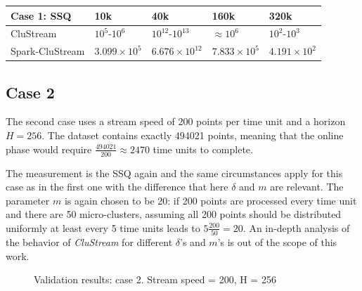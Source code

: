 \documentclass{llncs}
\begin{document}
\begin{center}
\begin{tabular}{|l|l|l|l|l|}\hline
\textbf{Case 1: SSQ} & \textbf{10k} & \textbf{40k} & \textbf{160k} & \textbf{320k}\\\hline
CluStream & $10^5$-$10^6$ & $10^{12}$-$10^{13}$ & $\approx 10^6$ & $10^2$-$10^3$\\\hline
Spark-CluStream & $3.099\times10^5$ & $6.676\times10^{12}$ & $7.833\times10^5$ & $4.191\times10^2$\\\hline
\end{tabular}
\end{center}



\subsection{Case 2}

The second case uses a stream speed of 200 points per time unit and a horizon $H=256$. The dataset contains exactly 494021 points, meaning that the online phase would require $\frac{494021}{200} \approx 2470$ time units to complete.

The measurement is the SSQ again and the same circumstances apply for this case as in the first one with the difference that here $\delta$ and $m$ are relevant. The parameter $m$ is again chosen to be 20: if 200 points are processed every time unit and there are 50 micro-clusters, assuming all 200 points should be distributed uniformly at least every 5 time units leads to $5\frac{200}{50}=20$. An in-depth analysis of the behavior of \textit{CluStream} for different $\delta$'s and $m$'s is out of the scope of this work. 


\begin{figure}[h]
\hfill
{}
\hfill
{}
\hfill
\caption{Validation results: case 2. Stream speed = 200, H = 256}
\label{fig:200h256}
\end{figure}
\end{document}
